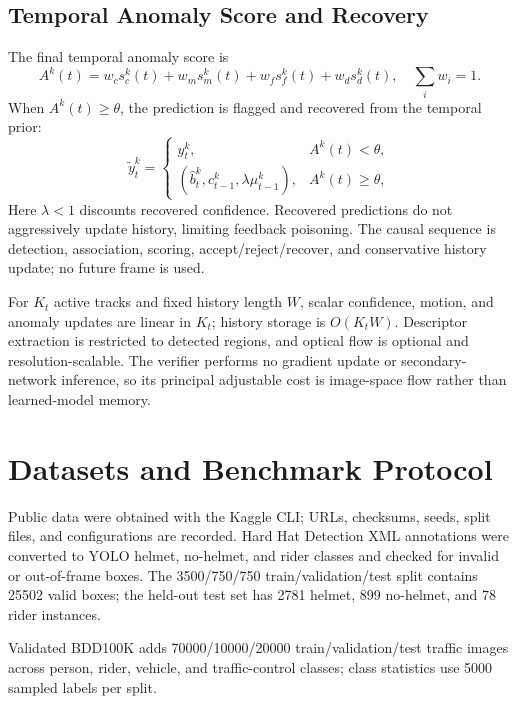 \documentclass[runningheads,a4paper]{llncs}
\begin{document}
\subsection{Temporal Anomaly Score and Recovery}
The final temporal anomaly score is
\begin{equation}
A^k(t)=w_c s_c^k(t)+w_m s_m^k(t)+w_f s_f^k(t)+w_d s_d^k(t),
\quad \sum_i w_i=1.
\end{equation}
When $A^k(t)\geq\theta$, the prediction is flagged and recovered from the temporal prior:
\begin{equation}
\tilde{y}_t^k=
\begin{cases}
y_t^k, & A^k(t)<\theta,\\
(\hat{b}_t^k,c_{t-1}^k,\lambda\mu_{t-1}^k), & A^k(t)\geq\theta,
\end{cases}
\end{equation}
Here $\lambda<1$ discounts recovered confidence. Recovered predictions do not aggressively update history, limiting feedback poisoning. The causal sequence is detection, association, scoring, accept/reject/recover, and conservative history update; no future frame is used.

For $K_t$ active tracks and fixed history length $W$, scalar confidence, motion, and anomaly updates are linear in $K_t$; history storage is $O(K_tW)$. Descriptor extraction is restricted to detected regions, and optical flow is optional and resolution-scalable. The verifier performs no gradient update or secondary-network inference, so its principal adjustable cost is image-space flow rather than learned-model memory.

\section{Datasets and Benchmark Protocol}

Public data were obtained with the Kaggle CLI; URLs, checksums, seeds, split files, and configurations are recorded. Hard Hat Detection XML annotations were converted to YOLO helmet, no-helmet, and rider classes and checked for invalid or out-of-frame boxes. The 3500/750/750 train/validation/test split contains 25502 valid boxes; the held-out test set has 2781 helmet, 899 no-helmet, and 78 rider instances.

Validated BDD100K \cite{yu2020bdd100k} adds 70000/10000/20000 train/validation/test traffic images across person, rider, vehicle, and traffic-control classes; class statistics use 5000 sampled labels per split.
\end{document}
